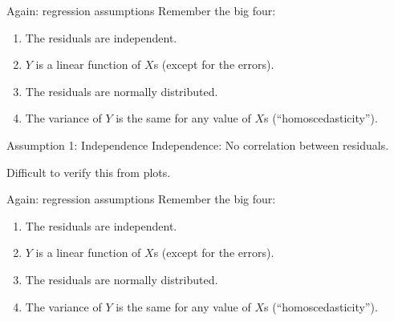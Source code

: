 \documentclass{beamer}\usepackage[]{graphicx}\usepackage[]{color}
\makeatletter
\newcommand{\hlopt}[1]{\textcolor[rgb]{1,0.894,0.769}{#1}}%
\newcommand{\hlstd}[1]{\textcolor[rgb]{1,0.894,0.769}{#1}}%
\newcommand{\hlkwd}[1]{\textcolor[rgb]{1,0.78,0.769}{#1}}%
\newenvironment{kframe}{%
 \def\at@end@of@kframe{}%
 \ifinner\ifhmode%
  \def\at@end@of@kframe{\end{minipage}}%
  \begin{minipage}{\columnwidth}%
 \fi\fi%
 \def\FrameCommand##1{\hskip\@totalleftmargin \hskip-\fboxsep
 \colorbox{shadecolor}{##1}\hskip-\fboxsep
     \hskip-\linewidth \hskip-\@totalleftmargin \hskip\columnwidth}%
 \MakeFramed {\advance\hsize-\width
   \@totalleftmargin\z@ \linewidth\hsize
   \@setminipage}}%
 {\par\unskip\endMakeFramed%
 \at@end@of@kframe}
\newenvironment{knitrout}{}{} %
\makeatother
\begin{document}
\begin{darkframes}
    
    
    
    \begin{frame}{Again: regression assumptions}
      Remember the big four:
      \begin{enumerate}
        \item \alert{The residuals are independent.}
        \item $Y$ is a linear function of $X$s (except for the errors).
        \item The residuals are normally distributed.
        \item The variance of $Y$ is the same for any value of $X$s (``homoscedasticity'').
    
      \end{enumerate}
    \end{frame}
    
    
    \begin{frame}[fragile]{Assumption 1: Independence}
      Independence: No correlation between residuals. \pause
    
      Difficult to verify this from plots.
      
    \end{frame}
    

    
    
    
    \begin{frame}{Again: regression assumptions}
      Remember the big four:
      \begin{enumerate}
        \item The residuals are independent.
        \item \alert{$Y$ is a linear function of $X$s (except for the errors).}
        \item The residuals are normally distributed.
        \item The variance of $Y$ is the same for any value of $X$s (``homoscedasticity'').
      \end{enumerate}
    \end{frame}
    

\end{darkframes}
\end{document}
